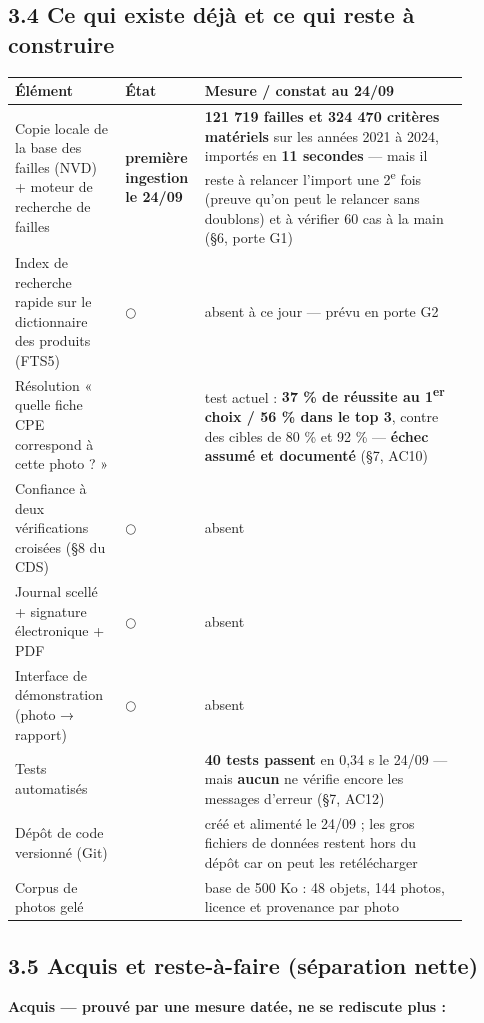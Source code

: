 \documentclass[11pt,a4paper]{article}
\newcommand{\fait}{\textcolor{green!45!black}{\ding{51}}}      %
\newcommand{\encours}{\textcolor{blue!65!black}{\ding{46}}}   %
\newcommand{\afaire}{\textcolor{orange!85!black}{$\bigcirc$}}  %
\begin{document}
\subsection*{3.4 Ce qui existe déjà et ce qui reste à construire}
\sloppy
\begin{longtable}{|p{0.234\linewidth}|p{0.104\linewidth}|p{0.559\linewidth}|}
\hline
\textbf{Élément} & \textbf{État} & \textbf{Mesure / constat au 24/09} \\ \hline
\endhead
Copie locale de la base des failles (NVD) + moteur de recherche de failles & \fait \textbf{première ingestion le 24/09} & \textbf{121 719 failles et 324 470 critères matériels} sur les années 2021 à 2024, importés en \textbf{11 secondes} — mais il reste à relancer l'import une 2\textsuperscript{e} fois (preuve qu'on peut le relancer sans doublons) et à vérifier 60 cas à la main (§6, porte G1) \\ \hline
Index de recherche rapide sur le dictionnaire des produits (FTS5) & \afaire & absent à ce jour — prévu en porte G2 \\ \hline
Résolution « quelle fiche CPE correspond à cette photo ? » & \encours & test actuel : \textbf{37 \% de réussite au 1\textsuperscript{er} choix / 56 \% dans le top 3}, contre des cibles de 80 \% et 92 \% — \textbf{échec assumé et documenté} (§7, AC10) \\ \hline
Confiance à deux vérifications croisées (§8 du CDS) & \afaire & absent \\ \hline
Journal scellé + signature électronique + PDF & \afaire & absent \\ \hline
Interface de démonstration (photo → rapport) & \afaire & absent \\ \hline
Tests automatisés & \fait & \textbf{40 tests passent} en 0,34 s le 24/09 — mais \textbf{aucun} ne vérifie encore les messages d'erreur (§7, AC12) \\ \hline
Dépôt de code versionné (Git) & \fait & créé et alimenté le 24/09 ; les gros fichiers de données restent hors du dépôt car on peut les retélécharger \\ \hline
Corpus de photos gelé & \fait & base de 500 Ko : 48 objets, 144 photos, licence et provenance par photo \\ \hline
\end{longtable}
\subsection*{3.5 Acquis et reste-à-faire (séparation nette)}
\textbf{Acquis — prouvé par une mesure datée, ne se rediscute plus :}
\end{document}
